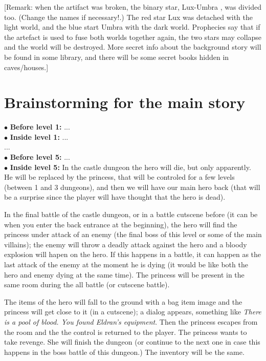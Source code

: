 \documentclass[12pt,a4paper]{report}
\begin{document}
[Remark: when the artifact was broken, the binary star, Lux-Umbra , was divided too. (Change the names if necessary!.)
The red star Lux was detached with the light world, and the blue start Umbra with the dark world.
Prophecies say that if the artefact is used to fuse both worlds together again, the two stars may collapse and the world will be destroyed.
More secret info about the background story will be found in some library, and there will be some secret books hidden in caves/houses.]


\section{Brainstorming for the main story}

$\bullet$ \textbf{Before level 1:} ... \\
$\bullet$ \textbf{Inside level 1:} ... \\
... \\
$\bullet$ \textbf{Before level 5:} ... \\
$\bullet$ \textbf{Inside level 5:} In the castle dungeon the hero will die, but only apparently. He will be replaced by
the princess, that will be controled for a few levels (between 1 and 3 dungeons), and then we will have our main hero
back (that will be a surprise since the player will have thought that the hero is dead).

\indent In the final battle of the castle dungeon, or in a
battle cutscene before (it can be when you enter the back entrance at the beginning), the hero will find the princess under
attack of an enemy (the final boss of this level or some of the main villains); the enemy will throw a deadly attack
against the hero and a bloody explosion will hapen on the hero. If this happens in a battle, it can happen as the last attack
of the enemy at the moment he is dying (it would be like both the hero and enemy dying at the same time). The princess will be
present in the same room during the all battle (or cutscene battle).

\indent The items of the hero will fall to the ground with a bag item image and the princess will get close to it (in a cutscene);
a dialog appears, something like \textit{There is a pool of blood. You found Eldran's equipment}. Then the princess escapes from
the room and the the control is returned to the player. The princess wants to take revenge. She will finish the dungeon (or continue to the next one in case this happens in the boss battle of this dungeon.) The inventory will be the same.
\end{document}

